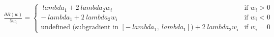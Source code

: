 \documentclass[preview]{standalone}
\begin{document}
\begin{align*}
\frac{\partial R(w)}{\partial w_i} =\begin{cases}\ lambda _1 + 2\ lambda _2 w_i & \text{if } w_i > 0 \\-\ lambda _1 + 2\ lambda _2 w_i & \text{if } w_i < 0 \\\text{undefined (subgradient in } [-\ lambda _1, \ lambda _1]) + 2\ lambda _2 w_i & \text{if } w_i = 0\end{cases}
\end{align*}
\end{document}
